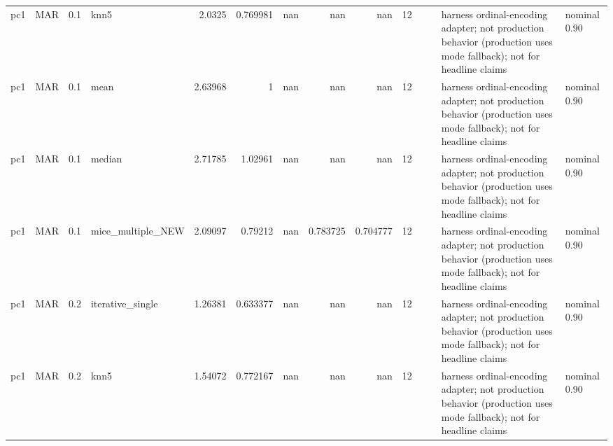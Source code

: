 \begin{table}[ht]
\begin{tabular}{llrlrrrrrrllll}
 pc1                  & MAR         &         0.1 & knn5              &       2.0325   &             0.769981 &               nan        &                     nan        &                       nan        &        12 &                    &                                         & harness ordinal-encoding adapter; not production behavior (production uses mode fallback); not for headline claims & nominal 0.90              \\
 pc1                  & MAR         &         0.1 & mean              &       2.63968  &             1        &               nan        &                     nan        &                       nan        &        12 &                    &                                         & harness ordinal-encoding adapter; not production behavior (production uses mode fallback); not for headline claims & nominal 0.90              \\
 pc1                  & MAR         &         0.1 & median            &       2.71785  &             1.02961  &               nan        &                     nan        &                       nan        &        12 &                    &                                         & harness ordinal-encoding adapter; not production behavior (production uses mode fallback); not for headline claims & nominal 0.90              \\
 pc1                  & MAR         &         0.1 & mice\_multiple\_NEW &       2.09097  &             0.79212  &               nan        &                       0.783725 &                         0.704777 &        12 &                    &                                         & harness ordinal-encoding adapter; not production behavior (production uses mode fallback); not for headline claims & nominal 0.90              \\
 pc1                  & MAR         &         0.2 & iterative\_single  &       1.26381  &             0.633377 &               nan        &                     nan        &                       nan        &        12 &                    &                                         & harness ordinal-encoding adapter; not production behavior (production uses mode fallback); not for headline claims & nominal 0.90              \\
 pc1                  & MAR         &         0.2 & knn5              &       1.54072  &             0.772167 &               nan        &                     nan        &                       nan        &        12 &                    &                                         & harness ordinal-encoding adapter; not production behavior (production uses mode fallback); not for headline claims & nominal 0.90              \\

\end{tabular}
\end{table}
